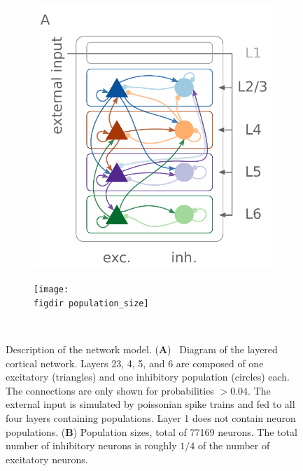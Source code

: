 \begin{figure} 
    \centering 
    \begin{subfigure}[b]{0.45\textwidth} 
        \includegraphics[width=\textwidth]{../figures/diagram_colored}
        \label{fig:diagram}
    \end{subfigure}
    \begin{subfigure}[b]{0.45\textwidth}
        \texttt{[image: \\figdir population\_size]}
        \label{fig:population_size}
    \end{subfigure} ~
    \caption{
        Description of the network model. 
        (\textbf{A})~%
        Diagram of the layered cortical network. 
        Layers 23, 4, 5, and 6 are composed of one excitatory
        (triangles) and one inhibitory population (circles) each.
        The connections are only shown for probabilities $>0.04$. 
        The external input is simulated by poissonian spike trains 
        and fed to all four layers containing populations. 
        Layer 1 does not contain neuron populations.
        (\textbf{B})
        Population sizes, total of 77169 neurons. The total number of inhibitory neurons is roughly
        $1 / 4$ of the number of excitatory neurons. 
    }
    \label{fig:model_description} 
\end{figure}
